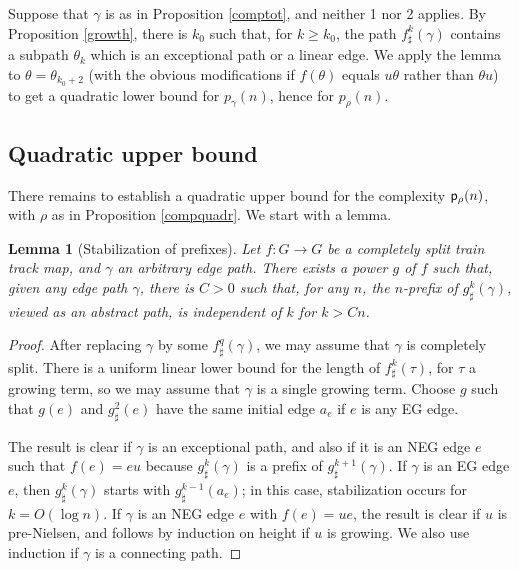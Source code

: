 \documentclass[11pt]{amsart}
\newtheorem{lem}[thm]{Lemma}
\theoremstyle{remark}
\newcommand{\cp}{{\sf  p}}
\begin{document}
Suppose that $\gamma$ is as in Proposition \ref{comptot}, and neither 1 nor 2 applies. By 
  Proposition \ref{growth}, there is $k_0$ such that, for $k\ge k_0$, the path   $f^k_\sharp(\gamma)$ contains a subpath $\theta_k$ which is an exceptional path   or a linear edge. We apply the lemma to $\theta=\theta_{k_0+2}$ (with the obvious modifications if $f(\theta)$ equals $u\theta$ rather than $\theta u$)  to get a quadratic lower bound for $p_\gamma(n)$, hence for 
  $p_\rho(n)$.


\subsection{Quadratic upper bound}

 There remains to establish a quadratic upper bound 
for the   complexity $\cp_\rho(n)$, with $\rho$ as in Proposition \ref{compquadr}. We start with a lemma.

 
  \begin{lem} [Stabilization of prefixes] \label{stabpref}
  Let $f:G\to G$ be a completely split train track map, and $\gamma$   an arbitrary edge path.
There exists a power $g$ of $f$ such that, given any edge path $\gamma$, there is $C>0$ such that, for any $n$,  the $n$-prefix of $g^k_\sharp(\gamma)$, viewed as an abstract path,  is independent of $k$ for $k>Cn$.
\end{lem}

\begin{proof}
 After replacing $\gamma$ by some $f^q_\sharp(\gamma)$, we may assume that $\gamma$ is completely split.
There is a uniform linear lower bound for the length of $f^k_\sharp(\tau)$, for $\tau$ a growing term, so we
may assume that $\gamma$ is a  single growing term. 
Choose $g$ such that $g(e)$ and $g^2_{\sharp}(e)$ have the same initial edge $a_e$  if $e$ is any   EG edge.

The result is clear  if  $\gamma$ is an exceptional path, and also if it is an  NEG edge $e$ such that  $f(e)=eu$ because $g^k_\sharp(\gamma)$ is a prefix of $g^{k+1}_\sharp(\gamma)$. 
If $\gamma$ is an    EG edge  $e$, then $g^k_\sharp(\gamma)$ starts with $g^{k-1}_\sharp(a_e)$; in this case, stabilization occurs for $k=O(\log n)$.
If $\gamma$ is an NEG edge $e$ with $f(e)=ue$, the result is clear if $u$ is pre-Nielsen, and follows by induction on height if $u$ is growing. We  also use induction if $\gamma$ is a connecting path. 
\end{proof}
\end{document}
